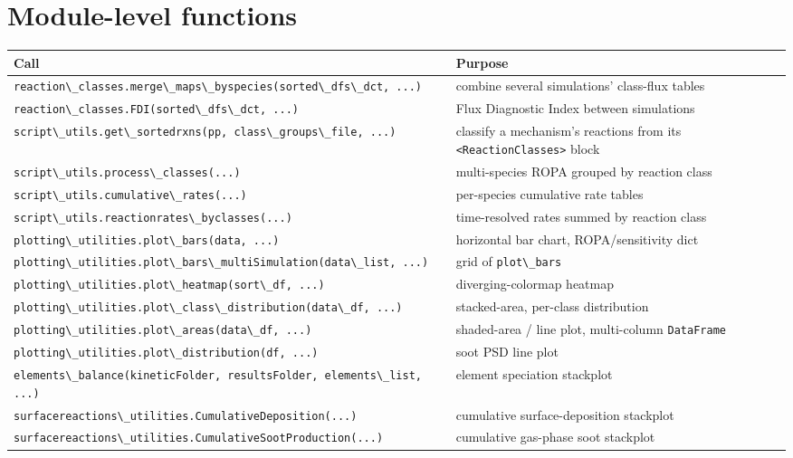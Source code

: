 \documentclass[11pt,a4paper]{report}
\newcommand{\pkg}[1]{\lstinline|#1|}
\begin{document}
\section{Module-level functions}
\begin{center}
\small
\begin{longtable}{p{6.6cm}p{9cm}}
\toprule
\textbf{Call} & \textbf{Purpose} \\
\midrule
\endhead
\pkg{reaction\_classes.merge\_maps\_byspecies(sorted\_dfs\_dct, ...)} & combine several simulations' class-flux tables \\
\pkg{reaction\_classes.FDI(sorted\_dfs\_dct, ...)} & Flux Diagnostic Index between simulations \\
\pkg{script\_utils.get\_sortedrxns(pp, class\_groups\_file, ...)} & classify a mechanism's reactions from its  \pkg{<ReactionClasses>} block \\
\pkg{script\_utils.process\_classes(...)} & multi-species ROPA grouped by reaction class \\
\pkg{script\_utils.cumulative\_rates(...)} & per-species cumulative rate tables \\
\pkg{script\_utils.reactionrates\_byclasses(...)} & time-resolved rates summed by reaction class \\
\pkg{plotting\_utilities.plot\_bars(data, ...)} & horizontal bar chart, ROPA/sensitivity dict \\
\pkg{plotting\_utilities.plot\_bars\_multiSimulation(data\_list, ...)} & grid of \pkg{plot\_bars} \\
\pkg{plotting\_utilities.plot\_heatmap(sort\_df, ...)} & diverging-colormap heatmap \\
\pkg{plotting\_utilities.plot\_class\_distribution(data\_df, ...)} & stacked-area, per-class distribution \\
\pkg{plotting\_utilities.plot\_areas(data\_df, ...)} & shaded-area / line plot, multi-column \pkg{DataFrame} \\
\pkg{plotting\_utilities.plot\_distribution(df, ...)} & soot PSD line plot \\
\pkg{elements\_balance(kineticFolder, resultsFolder, elements\_list, ...)} & element speciation stackplot \\
\pkg{surfacereactions\_utilities.CumulativeDeposition(...)} & cumulative surface-deposition stackplot \\
\pkg{surfacereactions\_utilities.CumulativeSootProduction(...)} & cumulative gas-phase soot stackplot \\
\bottomrule
\end{longtable}
\end{center}
\end{document}
